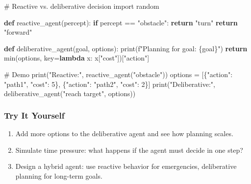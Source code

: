\documentclass[
  letterpaper,
  DIV=11,
  numbers=noendperiod]{scrreprt}
\newenvironment{Shaded}{\begin{snugshade}}{\end{snugshade}}
\newcommand{\BuiltInTok}[1]{\textcolor[rgb]{0.00,0.23,0.31}{#1}}
\newcommand{\CommentTok}[1]{\textcolor[rgb]{0.37,0.37,0.37}{#1}}
\newcommand{\ControlFlowTok}[1]{\textcolor[rgb]{0.00,0.23,0.31}{\textbf{#1}}}
\newcommand{\DecValTok}[1]{\textcolor[rgb]{0.68,0.00,0.00}{#1}}
\newcommand{\ImportTok}[1]{\textcolor[rgb]{0.00,0.46,0.62}{#1}}
\newcommand{\KeywordTok}[1]{\textcolor[rgb]{0.00,0.23,0.31}{\textbf{#1}}}
\newcommand{\NormalTok}[1]{\textcolor[rgb]{0.00,0.23,0.31}{#1}}
\newcommand{\OperatorTok}[1]{\textcolor[rgb]{0.37,0.37,0.37}{#1}}
\newcommand{\SpecialCharTok}[1]{\textcolor[rgb]{0.37,0.37,0.37}{#1}}
\newcommand{\SpecialStringTok}[1]{\textcolor[rgb]{0.13,0.47,0.30}{#1}}
\newcommand{\StringTok}[1]{\textcolor[rgb]{0.13,0.47,0.30}{#1}}
\providecommand{\tightlist}{%
  \setlength{\itemsep}{0pt}\setlength{\parskip}{0pt}}
\begin{document}
\begin{Shaded}
\begin{Highlighting}[]
\CommentTok{\# Reactive vs. deliberative decision}
\ImportTok{import}\NormalTok{ random}

\KeywordTok{def}\NormalTok{ reactive\_agent(percept):}
    \ControlFlowTok{if}\NormalTok{ percept }\OperatorTok{==} \StringTok{"obstacle"}\NormalTok{:}
        \ControlFlowTok{return} \StringTok{"turn"}
    \ControlFlowTok{return} \StringTok{"forward"}

\KeywordTok{def}\NormalTok{ deliberative\_agent(goal, options):}
    \BuiltInTok{print}\NormalTok{(}\SpecialStringTok{f"Planning for goal: }\SpecialCharTok{\{}\NormalTok{goal}\SpecialCharTok{\}}\SpecialStringTok{"}\NormalTok{)}
    \ControlFlowTok{return} \BuiltInTok{min}\NormalTok{(options, key}\OperatorTok{=}\KeywordTok{lambda}\NormalTok{ x: x[}\StringTok{"cost"}\NormalTok{])[}\StringTok{"action"}\NormalTok{]}

\CommentTok{\# Demo}
\BuiltInTok{print}\NormalTok{(}\StringTok{"Reactive:"}\NormalTok{, reactive\_agent(}\StringTok{"obstacle"}\NormalTok{))}
\NormalTok{options }\OperatorTok{=}\NormalTok{ [\{}\StringTok{"action"}\NormalTok{: }\StringTok{"path1"}\NormalTok{, }\StringTok{"cost"}\NormalTok{: }\DecValTok{5}\NormalTok{\}, \{}\StringTok{"action"}\NormalTok{: }\StringTok{"path2"}\NormalTok{, }\StringTok{"cost"}\NormalTok{: }\DecValTok{2}\NormalTok{\}]}
\BuiltInTok{print}\NormalTok{(}\StringTok{"Deliberative:"}\NormalTok{, deliberative\_agent(}\StringTok{"reach target"}\NormalTok{, options))}
\end{Highlighting}
\end{Shaded}

\subsubsection{Try It Yourself}\label{try-it-yourself-6}

\begin{enumerate}
\def\labelenumi{\arabic{enumi}.}
\tightlist
\item
  Add more options to the deliberative agent and see how planning
  scales.
\item
  Simulate time pressure: what happens if the agent must decide in one
  step?
\item
  Design a hybrid agent: use reactive behavior for emergencies,
  deliberative planning for long-term goals.
\end{enumerate}
\end{document}
